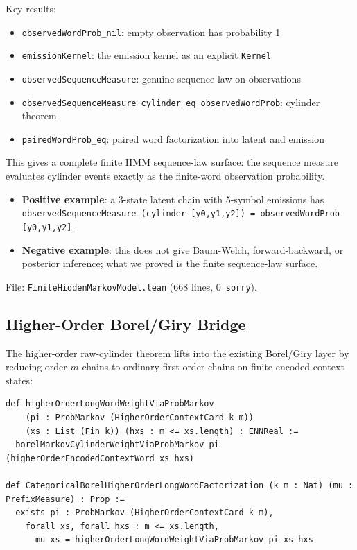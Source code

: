 \documentclass[11pt,a4paper]{article}
\theoremstyle{definition}
\begin{document}
Key results:
\begin{itemize}
\item \texttt{observedWordProb\_nil}: empty observation has probability 1
\item \texttt{emissionKernel}: the emission kernel as an explicit \texttt{Kernel}
\item \texttt{observedSequenceMeasure}: genuine sequence law on observations
\item \texttt{observedSequenceMeasure\_cylinder\_eq\_observedWordProb}: cylinder theorem
\item \texttt{pairedWordProb\_eq}: paired word factorization into latent and emission
\end{itemize}

This gives a complete finite HMM sequence-law surface: the sequence measure
evaluates cylinder events exactly as the finite-word observation probability.

\begin{itemize}
\item \textbf{Positive example}: a 3-state latent chain with 5-symbol emissions
  has \texttt{observedSequenceMeasure (cylinder [y0,y1,y2]) = observedWordProb [y0,y1,y2]}.
\item \textbf{Negative example}: this does not give Baum-Welch, forward-backward,
  or posterior inference; what we proved is the finite sequence-law surface.
\end{itemize}

File: \texttt{FiniteHiddenMarkovModel.lean} (668 lines, 0~\texttt{sorry}).

\subsection{Higher-Order Borel/Giry Bridge}

The higher-order raw-cylinder theorem lifts into the existing Borel/Giry layer
by reducing order-$m$ chains to ordinary first-order chains on finite
encoded context states:

\begin{lstlisting}
def higherOrderLongWordWeightViaProbMarkov
    (pi : ProbMarkov (HigherOrderContextCard k m))
    (xs : List (Fin k)) (hxs : m <= xs.length) : ENNReal :=
  borelMarkovCylinderWeightViaProbMarkov pi (higherOrderEncodedContextWord xs hxs)

def CategoricalBorelHigherOrderLongWordFactorization (k m : Nat) (mu : PrefixMeasure) : Prop :=
  exists pi : ProbMarkov (HigherOrderContextCard k m),
    forall xs, forall hxs : m <= xs.length,
      mu xs = higherOrderLongWordWeightViaProbMarkov pi xs hxs
\end{lstlisting}
\end{document}
